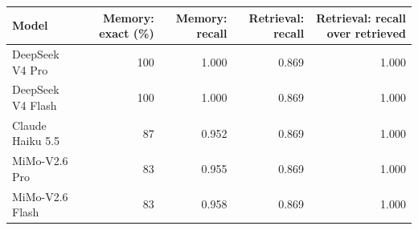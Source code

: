 \begin{tabular}{lrrrr}
\toprule
Model & Memory: exact (\%) & Memory: recall & Retrieval: recall & Retrieval: recall over retrieved \\
\midrule
DeepSeek V4 Pro & 100 & 1.000 & 0.869 & 1.000 \\
DeepSeek V4 Flash & 100 & 1.000 & 0.869 & 1.000 \\
Claude Haiku 5.5 & 87 & 0.952 & 0.869 & 1.000 \\
MiMo-V2.6 Pro & 83 & 0.955 & 0.869 & 1.000 \\
MiMo-V2.6 Flash & 83 & 0.958 & 0.869 & 1.000 \\
\bottomrule
\end{tabular}
